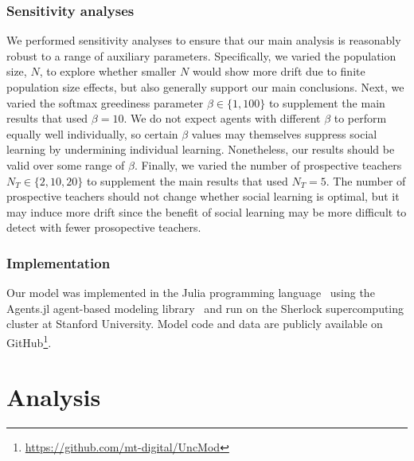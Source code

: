 \documentclass[letterpaper,11.5pt]{scrartcl}
\begin{document}
\subsubsection{Sensitivity analyses}

We performed sensitivity analyses to ensure that our main analysis is reasonably
robust to a range of auxiliary parameters. Specifically,
we varied the population size, $N$, to explore whether smaller $N$ would 
show more drift due to finite population size effects, but also generally support
our main conclusions. Next, we varied the
softmax greediness parameter $\beta \in \{1, 100\}$ to supplement the main results
that used $\beta = 10$. We do not
expect agents with different $\beta$ to perform equally well 
individually, so certain $\beta$ values may themselves suppress social learning
by undermining individual learning. Nonetheless, our results
should be valid over some range of $\beta$. Finally, we varied the
number of prospective teachers $N_T \in \{2, 10, 20\}$ 
to supplement the main results that used $N_T = 5$. The number of prospective
teachers should not change whether social learning is optimal, 
but it may induce more drift since the benefit of social learning may
be more difficult to detect with fewer prosopective teachers.


\subsubsection{Implementation}
Our model was implemented in the Julia programming language~\cite{Bezanson2017} 
using the Agents.jl agent-based modeling library~\cite{Datseris2022} and run
on the Sherlock supercomputing cluster at Stanford University. Model code and
data are publicly available on GitHub\footnote{\url{https://github.com/mt-digital/UncMod}}.


\section{Analysis}
\end{document}

